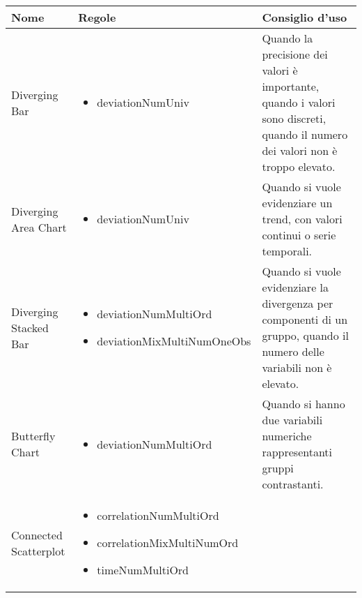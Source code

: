 \begin{xltabular}{\columnwidth}{|p{0.15\columnwidth}|X|p{0.27\columnwidth}|}
    \hline
    \textbf{Nome} & \textbf{Regole} & \textbf{Consiglio d'uso} \\
    \endhead
    \hline
    Diverging Bar & 
    \vspace{-3.5mm}
    \begin{itemize}[noitemsep,topsep=0pt, left=0pt]
        \item deviationNumUniv
    \end{itemize} & 
    Quando la precisione dei valori è importante, quando i valori sono discreti, quando il numero dei valori non è troppo elevato. \\
    \hline
    Diverging Area Chart & 
    \vspace{-3.5mm}
    \begin{itemize}[noitemsep,topsep=0pt, left=0pt]
        \item deviationNumUniv
    \end{itemize} & 
    Quando si vuole evidenziare un trend, con valori continui o serie temporali. \\
    \hline
    Diverging Stacked Bar & 
    \vspace{-3.5mm}
    \begin{itemize}[noitemsep,topsep=0pt, left=0pt]
        \item deviationNumMultiOrd
        \item deviationMixMultiNumOneObs
    \end{itemize} & 
    Quando si vuole evidenziare la divergenza per componenti di un gruppo, quando il numero delle variabili non è elevato. \\
    \hline
    Butterfly Chart & 
    \vspace{-3.5mm}
    \begin{itemize}[noitemsep,topsep=0pt, left=0pt]
        \item deviationNumMultiOrd
    \end{itemize} & 
    Quando si hanno due variabili numeriche rappresentanti gruppi contrastanti. \\
    \hline
    Connected Scatterplot & 
    \vspace{-3.5mm}
    \begin{itemize}[noitemsep,topsep=0pt, left=0pt]
        \item correlationNumMultiOrd
        \item correlationMixMultiNumOrd
        \item timeNumMultiOrd

\end{itemize}
\end{xltabular}
